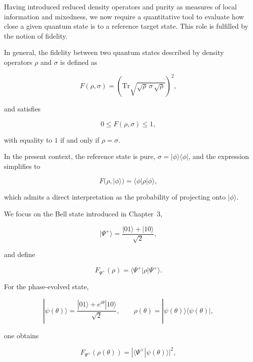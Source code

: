 Having introduced reduced density operators and purity as measures of local information and mixedness, we now require a quantitative tool to evaluate how close a given quantum state is to a reference target state. This role is fulfilled by the notion of fidelity.

\medskip

In general, the fidelity between two quantum states described by density operators \( \rho \) and \( \sigma \) is defined as

\begin{equation}
F(\rho,\sigma)
=
\left(
\mathrm{Tr}
\sqrt{
\sqrt{\rho}\,
\sigma\,
\sqrt{\rho}
}
\right)^2,
\label{eq:fidelity_general_definition}
\end{equation}

and satisfies

\[
0
\le
F(\rho,\sigma)
\le
1,
\]

with equality to \(1\) if and only if \( \rho = \sigma \).

\medskip

In the present context, the reference state is pure, \( \sigma = |\phi\rangle\langle\phi| \), and the expression simplifies to

\begin{equation}
F(\rho,|\phi\rangle)
=
\langle \phi | \rho | \phi \rangle,
\label{eq:fidelity_pure_reference}
\end{equation}

which admits a direct interpretation as the probability of projecting onto \( |\phi\rangle \).

\medskip

We focus on the Bell state introduced in Chapter~3,

\[
|\Psi^+\rangle
=
\frac{|01\rangle + |10\rangle}{\sqrt{2}},
\]

and define

\begin{equation}
F_{\Psi^+}(\rho)
=
\langle \Psi^+ | \rho | \Psi^+ \rangle.
\label{eq:fidelity_psi_plus_definition}
\end{equation}

\medskip

For the phase-evolved state,

\[
|\psi(\theta)\rangle
=
\frac{|01\rangle + e^{i\theta}|10\rangle}{\sqrt{2}},
\qquad
\rho(\theta)
=
|\psi(\theta)\rangle\langle\psi(\theta)|,
\]

one obtains

\[
F_{\Psi^+}(\rho(\theta))
=
|\langle \Psi^+|\psi(\theta)\rangle|^2,
\]

